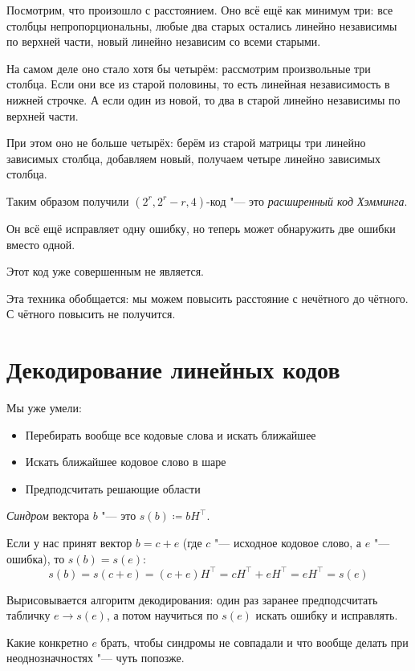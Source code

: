 Посмотрим, что произошло с расстоянием.
Оно всё ещё как минимум три: все столбцы непропорциональны,
любые два старых остались линейно независимы по верхней части,
новый линейно независим со всеми старыми.

На самом деле оно стало хотя бы четырём: рассмотрим произвольные три столбца.
Если они все из старой половины, то есть линейная независимость в нижней строчке.
А если один из новой, то два в старой линейно независимы по верхней части.

При этом оно не больше четырёх: берём из старой матрицы три линейно зависимых столбца,
добавляем новый, получаем четыре линейно зависимых столбца.

\begin{Def}
	Таким образом получили $(2^r, 2^r-r, 4)$-код "--- это \textit{расширенный код Хэмминга}.
\end{Def}
\begin{Rem}
	Он всё ещё исправляет одну ошибку, но теперь может обнаружить две ошибки вместо одной.
\end{Rem}
\begin{Rem}
	Этот код уже совершенным не является.
\end{Rem}
\begin{Rem}
	Эта техника обобщается: мы можем повысить расстояние с нечётного до чётного.
	С чётного повысить не получится.
\end{Rem}

\section{Декодирование линейных кодов}
Мы уже умели:
\begin{itemize}
\item Перебирать вообще все кодовые слова и искать ближайшее
\item Искать ближайшее кодовое слово в шаре
\item Предподсчитать решающие области
\end{itemize}

\begin{Def}
	\textit{Синдром} вектора $b$ "--- это $s(b)\coloneqq bH^\top$.
\end{Def}
\begin{lemma}
	Если у нас принят вектор $b=c+e$ (где $c$ "--- исходное кодовое слово, а $e$ "--- ошибка),
	то $s(b)=s(e)$:
	\[
		s(b) = s(c + e) = (c + e)H^\top = cH^\top + eH^\top = eH^\top = s(e)
	\]
\end{lemma}
\begin{Rem}
	Вырисовывается алгоритм декодирования: один раз заранее предподсчитать
	табличку $e \to s(e)$, а потом научиться по $s(e)$ искать ошибку и исправлять.
\end{Rem}
\begin{Rem}
	Какие конкретно $e$ брать, чтобы синдромы не совпадали и что вообще делать
	при неоднозначностях "--- чуть попозже.
\end{Rem}
